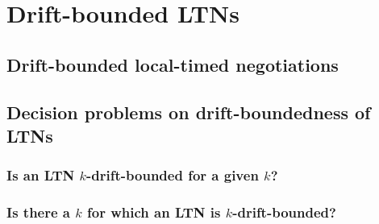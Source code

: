 
\chapter{Drift-bounded LTNs}

\section{Drift-bounded local-timed negotiations}

\section{Decision problems on drift-boundedness of LTNs}

\subsection{Is an LTN $k$-drift-bounded for a given $k$?}

\subsection{Is there a $k$ for which an LTN is $k$-drift-bounded?}
